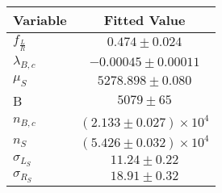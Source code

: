 \begin{tabular}[t]{lc}
\hline
Variable &Fitted Value\\
\hline\hline
$f_{\frac{L}{R}}$&$0.474\pm0.024$\\
\hline
$\lambda_{B,c}$&$-0.00045\pm0.00011$\\
\hline
$\mu_S$&$5278.898\pm0.080$\\
\hline
B&$5079\pm65$\\
\hline
$n_{B,c}$&$(2.133\pm0.027)\times 10^4$\\
\hline
$n_S$&$(5.426\pm0.032)\times 10^4$\\
\hline
$\sigma_{L_S}$&$11.24\pm0.22$\\
\hline
$\sigma_{R_S}$&$18.91\pm0.32$\\
\hline
\end{tabular}
